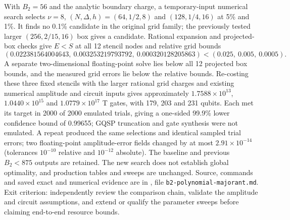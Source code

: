 \documentclass[11pt,a4paper]{article}
\begin{document}
With $B_2=56$ and the analytic boundary charge, a temporary-input numerical
search selects $\nu=8$, $(N,\Delta,h)=(64,1/2,8)$ and $(128,1/4,16)$
at 5\% and 1\%. It finds no 0.1\% candidate in the original grid family;
the previously tested larger $(256,2/15,16)$ box gives a candidate. Rational
expansion and projected-box checks give $E<S$ at all 12 stencil nodes and
relative grid bounds
\[
 (0.022381564004643,\ 0.003253219793792,\ 0.000320128205863)
 <(0.025,\ 0.005,\ 0.0005).
\]
A separate two-dimensional floating-point solve lies below all 12 projected
box bounds, and the measured grid errors lie below the relative bounds.
Re-costing these three fixed stencils with the larger rational grid charges
and existing numerical amplitude and circuit inputs gives approximately
$1.7588\times10^{13}$, $1.0440\times10^{15}$ and $1.0779\times10^{17}$ T
gates, with 179, 203 and 231 qubits. Each met its target in 2000 of 2000
emulated trials, giving a one-sided 99.9\% lower confidence bound of 0.99655;
GQSP truncation and gate synthesis were not emulated. A repeat produced the
same selections and identical sampled trial errors; two floating-point
amplitude-error fields changed by at most $2.91\times10^{-14}$ (tolerances
$10^{-10}$ relative and $10^{-12}$ absolute). The baseline and previous
$B_2<875$ outputs are retained. The new search does not establish
global optimality, and production tables and sweeps are unchanged. Source,
commands and saved exact and numerical evidence are in
, file \texttt{b2-polynomial-majorant.md}. Exit
criterion: independently review the comparison chain, validate the amplitude
and circuit assumptions, and extend or qualify the parameter sweeps before
claiming end-to-end resource bounds.
\end{document}
